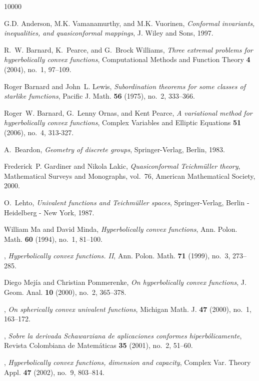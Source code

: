 \documentclass{lms}
\numberwithin{equation}{section}
\begin{document}
\begin{thebibliography}{10000}

G.D. Anderson, M.K. Vamanamurthy, and M.K. Vuorinen, \emph{Conformal
  invariants, inequalities, and quasiconformal mappings}, J. Wiley and Sons,
  1997.

R.~W. Barnard, K.~Pearce, and G.~Brock Williams, \emph{Three extremal problems
  for hyperbolically convex functions}, Computational Methods and Function
  Theory \textbf{4} (2004), no.~1, 97--109.

Roger Barnard and John~L. Lewis, \emph{Subordination theorems for some classes
  of starlike fumctions}, Pacific J. Math. \textbf{56} (1975), no.~2, 333--366.

Roger~W. Barnard, G.~Lenny Ornas, and Kent Pearce, \emph{A variational method
  for hyperbolically convex functions}, Complex Variables and Elliptic Equations 
  \textbf{51} (2006), no.~4, 313-327.

A.~Beardon, \emph{Geometry of discrete groups}, Springer-Verlag, Berlin, 1983.

Frederick~P. Gardiner and Nikola Lakic, \emph{Quasiconformal {T}eichm\"uller
  theory}, Mathematical Surveys and Monographs, vol.~76, American Mathematical
  Society, 2000.

O.~Lehto, \emph{Univalent functions and {T}eichm\"uller spaces},
  Springer-Verlag, Berlin - Heidelberg - New York, 1987.

William Ma and David Minda, \emph{Hyperbolically convex functions}, Ann. Polon.
  Math. \textbf{60} (1994), no.~1, 81--100. 

\bysame, \emph{Hyperbolically convex functions. {II}}, Ann. Polon. Math.
  \textbf{71} (1999), no.~3, 273--285. 

Diego Mej\'ia and Christian Pommerenke, \emph{On hyperbolically convex
  functions}, J. Geom. Anal. \textbf{10} (2000), no.~2, 365--378.

\bysame, \emph{On spherically convex univalent functions}, Michigan Math. J.
  \textbf{47} (2000), no.~1, 163--172. 

\bysame, \emph{Sobre la derivada {Schawarziana} de aplicaciones conformes
  hiperb\'olicamente}, Revista Colombiana de Matem\'aticas \textbf{35} (2001),
  no.~2, 51--60.

\bysame, \emph{Hyperbolically convex functions, dimension and capacity},
  Complex Var. Theory Appl. \textbf{47} (2002), no.~9, 803--814.


\end{thebibliography}
\end{document}
